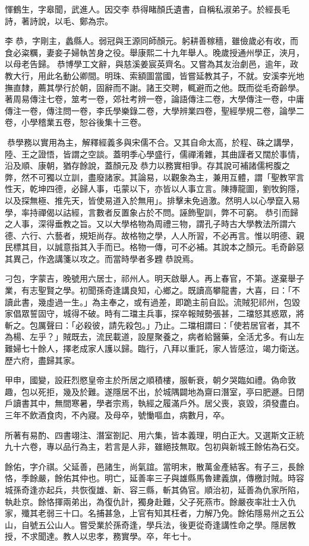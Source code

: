 \begin{pinyinscope}
惲鶴生，字皋聞，武進人。因交李恭得睹顏氏遺書，自稱私淑弟子。於經長毛詩，著詩說，以毛、鄭為宗。

李恭，字剛主，蠡縣人。弱冠與王源同師顏元。躬耕善稼穡，雖儉歲必有收，而食必粢糲，妻妾子婦執苦身之役。舉康熙二十九年舉人。晚歲授通州學正，浹月，以母老告歸。恭博學工文辭，與慈溪姜宸英齊名。又嘗為其友治劇邑，逾年，政教大行，用此名動公卿間。明珠、索額圖當國，皆嘗延教其子，不就。安溪李光地撫直隸，薦其學行於朝，固辭而不謝。諸王交聘，輒避而之他。既而從毛奇齡學。著周易傳注七卷，筮考一卷，郊社考辨一卷，論語傳注二卷，大學傳注一卷，中庸傳注一卷，傳注問一卷，李氏學樂錄二卷，大學辨業四卷，聖經學規二卷，論學二卷，小學稽業五卷，恕谷後集十三卷。

恭學務以實用為主，解釋經義多與宋儒不合。又其自命太高，於程、硃之講學，陸、王之證悟，皆謂之空談。蓋明季心學盛行，儒禪淆雜，其曲謹者又闊於事情，沿及順、康朝，猶存餘說，蓋顏元及恭力以務實相爭。存其說可補諸儒枵腹之弊，然不可獨以立訓，盡廢諸家。其論易，以觀象為主，兼用互體，謂「聖教罕言性天，乾坤四德，必歸人事，屯蒙以下，亦皆以人事立言。陳摶龍圖，劉牧鉤隱，以及探無極、推先天，皆使易道入於無用」。排擊未免過激。然明人以心學竄入易學，率持禪偈以詁經，言數者反置象占於不問。誣飾聖訓，弊不可窮。恭引而歸之人事，深得垂教之旨。又以大學格物為周禮三物，謂孔子時古大學教法所謂六德、六行、六藝者，規矩尚存。故格物之學，人人所習，不必再言。惟以明德、親民標其目，以誠意指其入手而已。格物一傳，可不必補。其說本之顏元。毛奇齡惡其異己，作逸講箋以攻之。而當時學者多韙恭說焉。

刁包，字蒙吉，晚號用六居士，祁州人。明天啟舉人。再上春官，不第。遂棄舉子業，有志聖賢之學。初聞孫奇逢講良知，心鄉之。既讀高攀龍書，大喜，曰：「不讀此書，幾虛過一生。」為主奉之，或有過差，即跪主前自訟。流賊犯祁州，包毀家倡眾誓固守，城得不破。時有二璫主兵事，探卒報賊勢張甚，二璫怒其惑眾，將斬之。包厲聲曰：「必殺彼，請先殺包。」乃止。二璫相謂曰：「使若居官者，其不為楊、左乎？」賊既去，流民載道，設屋聚養之，病者給醫藥，全活尤多。有山左難婦七十餘人，擇老成家人護以歸。臨行，八拜以重託，家人皆感泣，竭力衛送。歷六府，盡歸其家。

甲申，國變，設莊烈愍皇帝主於所居之順積樓，服斬衰，朝夕哭臨如禮。偽命敦趣，包以死拒，幾及於難。遂隱居不出，於城隅闢地為齋曰潛室，亭曰肥遯。日閉戶讀書其中，無間寒暑，學者宗焉，執經之履滿戶外。居父喪，哀毀，須發盡白。三年不飲酒食肉，不內寢。及母卒，號慟嘔血，病數月，卒。

所著有易酌、四書翊注、潛室劄記、用六集，皆本義理，明白正大。又選斯文正統九十六卷，專以品行為主，若言是人非，雖絕技無取。包初與新城王餘佑為石交。

餘佑，字介祺。父延善，邑諸生，尚氣誼。當明末，散萬金產結客。有子三，長餘恪，季餘嚴，餘佑其仲也。明亡，延善率三子與雄縣馬魯建義旗，傳檄討賊。時容城孫奇逢亦起兵，共恢復雄、新、容三縣，斬其偽官。順治初，延善為仇家所陷，執赴京。餘恪揮兩弟出，為復仇計，獨身赴難，父子死燕巿。餘嚴夜率壯士入仇家，殲其老弱三十口。名捕甚急，上官有知其枉者，力解乃免。餘佑隱易州之五公山，自號五公山人。嘗受業於孫奇逢，學兵法，後更從奇逢講性命之學。隱居教授，不求聞達。教人以忠孝，務實學。卒，年七十。


\end{pinyinscope}
